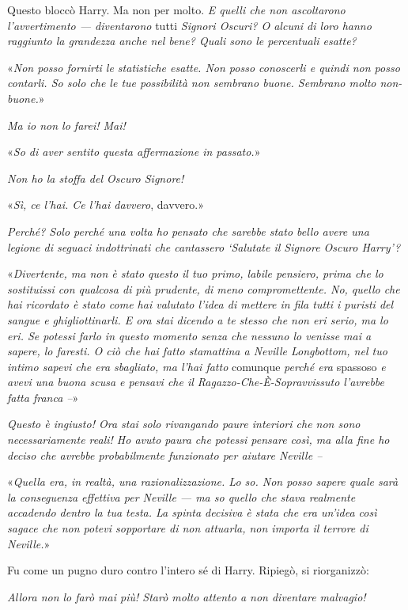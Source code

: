 Questo bloccò Harry. Ma non per molto. \textit{E quelli che non ascoltarono l’avvertimento — diventarono} tutti \textit{Signori Oscuri? O alcuni di loro hanno raggiunto la grandezza anche nel bene? Quali sono le percentuali esatte?}

«\textit{Non posso fornirti le statistiche esatte. Non posso conoscerli e quindi non posso contarli. So solo che le tue possibilità non sembrano buone. Sembrano molto non-buone.}»

\textit{Ma io non lo farei! Mai!}

«\textit{So di aver sentito questa affermazione in passato.}»

\textit{Non ho la stoffa del Oscuro Signore!}

«\textit{Sì, ce l’hai. Ce l’hai davvero}, davvero.»

\textit{Perché? Solo perché una volta ho pensato che sarebbe stato bello avere una legione di seguaci indottrinati che cantassero ‘Salutate il Signore Oscuro Harry’?}

«\textit{Divertente, ma non è stato questo il tuo primo, labile pensiero, prima che lo sostituissi con qualcosa di più prudente, di meno compromettente. No, quello che hai ricordato è stato come hai valutato l’idea di mettere in fila tutti i puristi del sangue e ghigliottinarli. E ora stai dicendo a te stesso che non eri serio, ma lo eri. Se potessi farlo in questo momento senza che nessuno lo venisse mai a sapere, lo faresti. O ciò che hai fatto stamattina a Neville Longbottom, nel tuo intimo sapevi che era sbagliato, ma l’hai fatto} comunque \textit{perché era} spassoso \textit{e avevi una buona scusa e pensavi che il Ragazzo-Che-È-Sopravvissuto l’avrebbe fatta franca –}»

\textit{Questo è ingiusto! Ora stai solo rivangando paure interiori che non sono necessariamente reali! Ho avuto paura che potessi pensare così, ma alla fine ho deciso che avrebbe probabilmente funzionato per aiutare Neville –}

«\textit{Quella era, in realtà, una razionalizzazione. Lo so. Non posso sapere quale sarà la conseguenza effettiva per Neville — ma so quello che stava realmente accadendo dentro la tua testa. La spinta decisiva è stata che era un’idea così sagace che non potevi sopportare di non attuarla, non importa il terrore di Neville.}»

Fu come un pugno duro contro l’intero sé di Harry. Ripiegò, si riorganizzò:

\textit{Allora non lo farò mai più! Starò molto attento a non diventare malvagio!}

